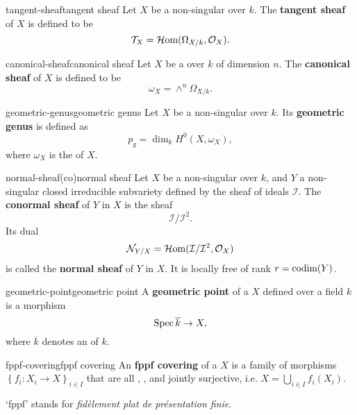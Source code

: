 \begin{topic}{tangent-sheaf}{tangent sheaf}
    Let $X$ be a non-singular  over $k$. The \textbf{tangent sheaf} of $X$ is defined to be
    \[ \mathcal{T}_X = \mathcal{H}\textup{om}(\Omega_{X/k}, \mathcal{O}_X) . \]
\end{topic}

\begin{topic}{canonical-sheaf}{canonical sheaf}
    Let $X$ be a   over $k$ of dimension $n$. The \textbf{canonical sheaf} of $X$ is defined to be
    \[ \omega_X = \wedge^n \Omega_{X/k} . \]
\end{topic}

\begin{topic}{geometric-genus}{geometric genus}
    Let $X$ be a non-singular  over $k$. Its \textbf{geometric genus} is defined as
    \[ p_g = \dim_k H^0(X, \omega_X) , \]
    where $\omega_X$ is the  of $X$.
\end{topic}

\begin{topic}{normal-sheaf}{(co)normal sheaf}
    Let $X$ be a non-singular  over $k$, and $Y$ a non-singular closed irreducible subvariety defined by the sheaf of ideals $\mathcal{I}$. The \textbf{conormal sheaf} of $Y$ in $X$ is the sheaf
    \[ \mathcal{I}/\mathcal{I}^2 . \]
    Its dual
    \[ \mathcal{N}_{Y/X} = \mathcal{H}\textup{om}(\mathcal{I}/\mathcal{I}^2, \mathcal{O}_X) \]
    is called the \textbf{normal sheaf} of $Y$ in $X$. It is locally free of rank $r = \textup{codim}(Y)$.
\end{topic}

\begin{topic}{geometric-point}{geometric point}
    A \textbf{geometric point} of a  $X$ defined over a field $k$ is a morphism
    \[ \operatorname{Spec} \overline{k} \to X , \]
    where $\overline{k}$ denotes an  of $k$.
\end{topic}

\begin{topic}{fppf-covering}{fppf covering}
    An \textbf{fppf covering} of a  $X$ is a family of morphisms $\left\{ f_i : X_i \to X \right\}_{i \in I}$ that are all , , and jointly surjective, i.e. $X = \bigcup_{i \in I} f_i(X_i)$.
    
    `fppf' stands for \textit{fidèlement plat de présentation finie}.
\end{topic}

